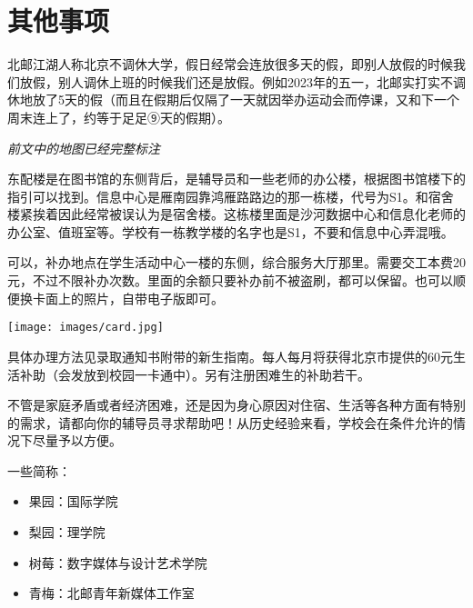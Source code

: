 \section{其他事项}


北邮江湖人称北京不调休大学，假日经常会连放很多天的假，即别人放假的时候我们放假，别人调休上班的时候我们还是放假。例如2023年的五一，北邮实打实不调休地放了5天的假（而且在假期后仅隔了一天就因举办运动会而停课，又和下一个周末连上了，约等于足足⑨天的假期）。


\emph{前文中的地图已经完整标注}

东配楼是在图书馆的东侧背后，是辅导员和一些老师的办公楼，根据图书馆楼下的指引可以找到。信息中心是雁南园靠鸿雁路路边的那一栋楼，代号为S1。和宿舍楼紧挨着因此经常被误认为是宿舍楼。这栋楼里面是沙河数据中心和信息化老师的办公室、值班室等。学校有一栋教学楼的名字也是S1，不要和信息中心弄混哦。


可以，补办地点在学生活动中心一楼的东侧，综合服务大厅那里。需要交工本费20元，不过不限补办次数。里面的余额只要补办前不被盗刷，都可以保留。也可以顺便换卡面上的照片，自带电子版即可。


\begin{center}
    \texttt{[image: images/card.jpg]}
\end{center}

具体办理方法见录取通知书附带的新生指南。每人每月将获得北京市提供的60元生活补助（会发放到校园一卡通中）。另有注册困难生的补助若干。


不管是家庭矛盾或者经济困难，还是因为身心原因对住宿、生活等各种方面有特别的需求，请都向你的辅导员寻求帮助吧！从历史经验来看，学校会在条件允许的情况下尽量予以方便。


一些简称：
\begin{itemize}
    \item 果园：国际学院
    \item 梨园：理学院
    \item 树莓：数字媒体与设计艺术学院
    \item 青梅：北邮青年新媒体工作室
\end{itemize}

